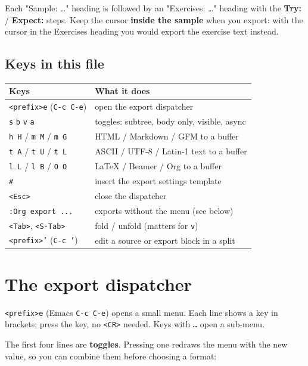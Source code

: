 Each "Sample: \ldots{}" heading is followed by an "Exercises: \ldots{}" heading with
the \textbf{Try:} / \textbf{Expect:} steps. Keep the cursor \textbf{inside the sample} when you
export: with the cursor in the Exercises heading you would export the
exercise text instead.
\subsection{Keys in this file}
\label{sec:orgefbd59a}
\begin{center}
\begin{tabular}{ll}
Keys & What it does\\
\hline
\texttt{<prefix>e} (\texttt{C-c C-e}) & open the export dispatcher\\
\texttt{s} \texttt{b} \texttt{v} \texttt{a} & toggles: subtree, body only, visible, async\\
\texttt{h H} / \texttt{m M} / \texttt{m G} & HTML / Markdown / GFM to a buffer\\
\texttt{t A} / \texttt{t U} / \texttt{t L} & ASCII / UTF-8 / Latin-1 text to a buffer\\
\texttt{l L} / \texttt{l B} / \texttt{O O} & \LaTeX{} / Beamer / Org to a buffer\\
\texttt{\#} & insert the export settings template\\
\texttt{<Esc>} & close the dispatcher\\
\texttt{:Org export ...} & exports without the menu (see below)\\
\texttt{<Tab>}, \texttt{<S-Tab>} & fold / unfold (matters for \texttt{v})\\
\texttt{<prefix>'} (\texttt{C-c '}) & edit a source or export block in a split\\
\end{tabular}
\end{center}
\section{The export dispatcher}
\label{sec:org99af24e}
\texttt{<prefix>e} (Emacs \texttt{C-c C-e}) opens a small menu. Each line shows a key in
brackets; press the key, no \texttt{<CR>} needed. Keys with \texttt{…} open a sub-menu.

The first four lines are \textbf{toggles}. Pressing one redraws the menu with the
new value, so you can combine them before choosing a format:

